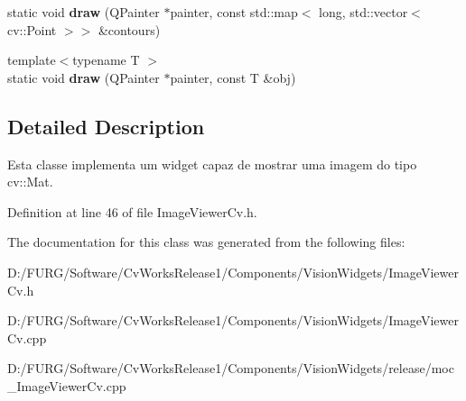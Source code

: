 \begin{DoxyCompactItemize}
\item 
\hypertarget{class_image_viewer_cv_a83584052e2f08ba84cc42da0cccc7c8c}{}static void {\bfseries draw} (Q\+Painter $\ast$painter, const std\+::map$<$ long, std\+::vector$<$ cv\+::\+Point $>$$>$ \&contours)\label{class_image_viewer_cv_a83584052e2f08ba84cc42da0cccc7c8c}

\item 
\hypertarget{class_image_viewer_cv_af2f7471e6083fbab9377742e44b98427}{}{\footnotesize template$<$typename T $>$ }\\static void {\bfseries draw} (Q\+Painter $\ast$painter, const T \&obj)\label{class_image_viewer_cv_af2f7471e6083fbab9377742e44b98427}

\end{DoxyCompactItemize}


\subsection{Detailed Description}
Esta classe implementa um widget capaz de mostrar uma imagem do tipo cv\+::\+Mat. 

Definition at line 46 of file Image\+Viewer\+Cv.\+h.



The documentation for this class was generated from the following files\+:\begin{DoxyCompactItemize}
\item 
D\+:/\+F\+U\+R\+G/\+Software/\+Cv\+Works\+Release1/\+Components/\+Vision\+Widgets/Image\+Viewer\+Cv.\+h\item 
D\+:/\+F\+U\+R\+G/\+Software/\+Cv\+Works\+Release1/\+Components/\+Vision\+Widgets/Image\+Viewer\+Cv.\+cpp\item 
D\+:/\+F\+U\+R\+G/\+Software/\+Cv\+Works\+Release1/\+Components/\+Vision\+Widgets/release/moc\+\_\+\+Image\+Viewer\+Cv.\+cpp\end{DoxyCompactItemize}
